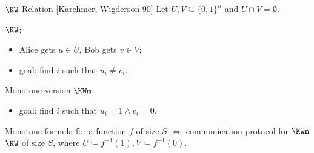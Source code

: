 \begin{frame}{$\KW$ Relation [Karchmer, Wigderson 90]}
    Let $U, V \subseteq \{0, 1\}^{n}$ and $U \cap V = \emptyset$.

    \vspace{0.1cm}
    $\KW$:
    \begin{itemize}
        \item Alice gets $u \in U$, Bob gets $v \in V$;
        \item goal: find $i$ such that $u_i \neq v_i$.
    \end{itemize}
    \pause
    Monotone version $\KWm$:
    \begin{itemize}
        \item goal: find $i$ such that $u_i = 1 \land v_i = 0$.
    \end{itemize}

    \pause

    \begin{theorem}
        \alert{Monotone} formula for a function $f$ of size $S$ $\Leftrightarrow$ communication protocol
        for \alert{$\KWm$} $\KW$ of size $S$, where $U \coloneqq f^{-1}(1), V \coloneqq f^{-1}(0)$.
    \end{theorem}
\end{frame}


